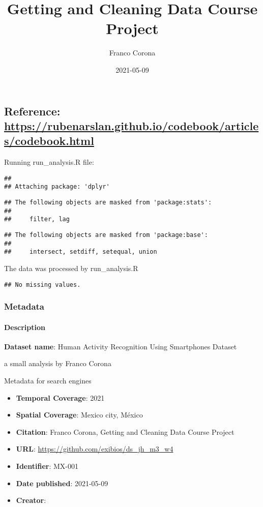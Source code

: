\documentclass[
]{article}
\title{Getting and Cleaning Data Course Project}
\author{Franco Corona}
\date{2021-05-09}
\begin{document}
\maketitle

\hypertarget{reference-httpsrubenarslan.github.iocodebookarticlescodebook.html}{%
\subsection{\texorpdfstring{Reference:
\url{https://rubenarslan.github.io/codebook/articles/codebook.html}}{Reference: https://rubenarslan.github.io/codebook/articles/codebook.html}}\label{reference-httpsrubenarslan.github.iocodebookarticlescodebook.html}}

Running run\_analysis.R file:

\begin{verbatim}
## 
## Attaching package: 'dplyr'
\end{verbatim}

\begin{verbatim}
## The following objects are masked from 'package:stats':
## 
##     filter, lag
\end{verbatim}

\begin{verbatim}
## The following objects are masked from 'package:base':
## 
##     intersect, setdiff, setequal, union
\end{verbatim}

The data was processed by run\_analysis.R

\begin{verbatim}
## No missing values.
\end{verbatim}

\hypertarget{metadata}{%
\subsubsection{Metadata}\label{metadata}}

\hypertarget{description}{%
\paragraph{Description}\label{description}}

\textbf{Dataset name}: Human Activity Recognition Using Smartphones
Dataset

a small analysis by Franco Corona

Metadata for search engines

\begin{itemize}
\item
  \textbf{Temporal Coverage}: 2021
\item
  \textbf{Spatial Coverage}: Mexico city, México
\item
  \textbf{Citation}: Franco Corona, Getting and Cleaning Data Course
  Project
\item
  \textbf{URL}: \url{https://github.com/exibios/ds_jh_m3_w4}
\item
  \textbf{Identifier}: MX-001
\item
  \textbf{Date published}: 2021-05-09
\item
  \textbf{Creator}:
\end{itemize}
\end{document}
